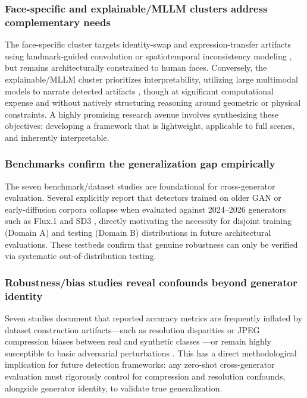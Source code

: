 \documentclass[sn-mathphys-num,Numbered,pdflatex]{sn-jnl}
\begin{document}
\subsubsection{Face-specific and explainable/MLLM clusters address complementary needs}
The face-specific cluster targets identity-swap and expression-transfer artifacts using landmark-guided convolution \cite{TowardsGeneralizable49} or spatiotemporal inconsistency modeling \cite{DynamicSpatialtemporal50}, but remains architecturally constrained to human faces. Conversely, the explainable/MLLM cluster prioritizes interpretability, utilizing large multimodal models to narrate detected artifacts \cite{AigiholmesTowards13,SpotThe58}, though at significant computational expense and without natively structuring reasoning around geometric or physical constraints. A highly promising research avenue involves synthesizing these objectives: developing a framework that is lightweight, applicable to full scenes, and inherently interpretable.

\subsubsection{Benchmarks confirm the generalization gap empirically}
The seven benchmark/dataset studies are foundational for cross-generator evaluation. Several explicitly report that detectors trained on older GAN or early-diffusion corpora collapse when evaluated against 2024--2026 generators such as Flux.1 and SD3 \cite{Deepfakeeval2024A64, AigenbenchA72}, directly motivating the necessity for disjoint training (Domain A) and testing (Domain B) distributions in future architectural evaluations. These testbeds confirm that genuine robustness can only be verified via systematic out-of-distribution testing.

\subsubsection{Robustness/bias studies reveal confounds beyond generator identity}
Seven studies document that reported accuracy metrics are frequently inflated by dataset construction artifacts—such as resolution disparities or JPEG compression biases between real and synthetic classes \cite{FakeOr35}—or remain highly susceptible to basic adversarial perturbations \cite{AdversarialRobustness65}. This has a direct methodological implication for future detection frameworks: any zero-shot cross-generator evaluation must rigorously control for compression and resolution confounds, alongside generator identity, to validate true generalization.
\end{document}
